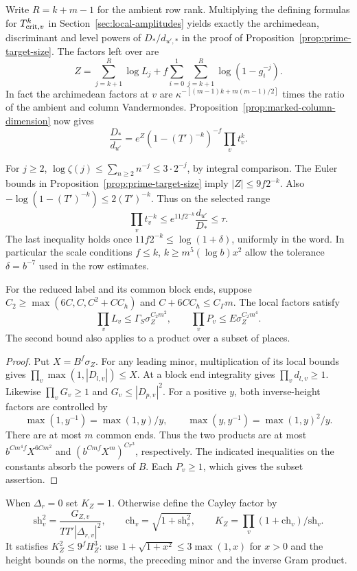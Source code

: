 Write \(R=k+m-1\) for the ambient row rank. Multiplying the defining formulas for \(T_{{\rm crit},v}^k\) in Section~\ref{sec:local-amplitudes} yields exactly the archimedean, discriminant and level powers of \(D_*/d_{u',*}\) in the proof of Proposition~\ref{prop:prime-target-size}. The factors left over are
\[
 Z=\sum_{j=k+1}^R\log L_j+
        f\sum_{i=0}^1\sum_{j=k+1}^R\log(1-g_i^{-j}).
\]
In fact the archimedean factors at \(v\) are \(\kappa^{-[(m-1)k+m(m-1)/2]}\) times the ratio of the ambient and column Vandermondes. Proposition~\ref{prop:marked-column-dimension} now gives
\[
 \frac{D_*}{d_{u'}}=e^Z (1-(T')^{-k})^{-f}\prod_v t_v^k .
\]

For \(j\ge2\), \(\log\zeta(j)\le\sum_{n\ge2}n^{-j}\le3\cdot2^{-j}\), by integral comparison. The Euler bounds in Proposition~\ref{prop:prime-target-size} imply \(|Z|\le9f2^{-k}\). Also \(-\log(1-(T')^{-k})\le2(T')^{-k}\). Thus on the selected range
\[
 \prod_v t_v^{-k}\le e^{11f2^{-k}}\frac{d_{u'}}{D_*}\le\tau .
\]
The last inequality holds once \(11f2^{-k}\le\log(1+\delta)\), uniformly in the word. In particular the scale conditions \(f\le k\), \(k\ge m^5(\log b)x^2\) allow the tolerance \(\delta=b^{-7}\) used in the row estimates. \label{cor:row-sums-1}

\begin{lemma}\label{lem:row-height-products}
For the reduced label and its common block ends, suppose
\(C_2\ge\max(6C,C,C^2+CC_h)\) and \(C+6CC_h\le C_\Gamma m\).
The local factors satisfy
\[
 \prod_v L_v\le\Gamma_S\sigma_Z^{C_2m^2},\qquad
 \prod_v P_v\le E\sigma_Z^{C_2m^4}.
\]
The second bound also applies to a product over a subset of places.
\end{lemma}

\begin{proof}
Put \(X=B^f\sigma_Z\). For any leading minor, multiplication of
its local bounds gives \(\prod_v\max(1,|D_{l,v}|)\le X\).
At a block end integrality gives \(\prod_v d_{l,v}\ge1\). Likewise
\(\prod_v G_v\ge1\) and \(G_v\le |D_{p,v}|^2\).
For a positive \(y\), both inverse-height factors are controlled by
\[
 \max(1,y^{-1})=\max(1,y)/y,\qquad
 \max(y,y^{-1})=\max(1,y)^2/y.
\]
There are at most \(m\) common ends. Thus the two products are at
most \(b^{Cm^4 f}X^{6Cm^2}\) and \((b^{Cmf}X^m)^{Cr^3}\),
respectively. The indicated inequalities on the constants absorb the
powers of \(B\). Each \(P_v\ge1\), which gives the subset assertion.
\end{proof}

When \(\Delta_r=0\) set \(K_Z=1\). Otherwise define the Cayley factor by
\[
 \mathrm{sh}_v^2=\frac{G_{Z,v}}{TT'|\Delta_{r,v}|^2},\qquad
 \mathrm{ch}_v=\sqrt{1+\mathrm{sh}_v^2},\qquad
 K_Z=\prod_v(1+\mathrm{ch}_v)/\mathrm{sh}_v.
\]
It satisfies \(K_Z^2\le9^f H_Z^3\): use
\(1+\sqrt{1+x^2}\le3\max(1,x)\) for \(x>0\) and the height bounds
on the norms, the preceding minor and the inverse Gram product.

